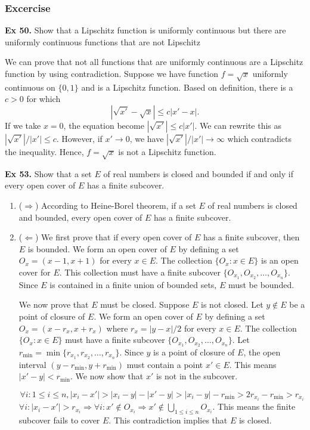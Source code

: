 \subsubsection{Excercise}

\textbf{Ex 50.} Show that a Lipschitz function is uniformly continuous but there are uniformly continuous functions that are not Lipschitz

We can prove that not all functions that are uniformly continuous are a Lipschitz function by using contradiction. Suppose we have function $f = \sqrt{x}$ uniformly continuous on $\{0, 1\}$ and is a Lipschitz function. Based on definition, there is a $c > 0$ for which
\begin{equation}
    |\sqrt{x'} - \sqrt{x}| \leq c|x' - x|.
\end{equation}
If we take $x = 0$, the equation become $|\sqrt{x'}| \leq c |x'|$. We can rewrite this as $|\sqrt{x'}|/|x'| \leq c$. However, if $x' \rightarrow 0$, we have $|\sqrt{x'}|/|x'| \rightarrow \infty$ which contradicts the inequality. Hence, $f = \sqrt{x}$ is not a Lipschitz function.

\noindent \textbf{Ex 53.} \label{ex:53}
Show that a set $E$ of real numbers is closed and bounded if and only if every open cover of $E$ has a finite subcover.
\begin{enumerate}[label=(\roman*)]
	\item ($\Rightarrow$) According to Heine-Borel theorem, if a set $E$ of real numbers is closed and bounded, every open cover of $E$ has a finite subcover.
	
	\item ($\Leftarrow$) We first prove that if every open cover of $E$ has a finite subcover, then $E$ is bounded. We form an open cover of $E$ by defining a set $O_x = (x - 1, x + 1)$ for every $x \in E$. The collection $\{O_x: x\in E\}$ is an open cover for $E$. This collection must have a finite subcover $\{O_{x_1}, O_{x_2}, \ldots, O_{x_n}\}$. Since $E$ is contained in a finite union of bounded sets, $E$ must be bounded.
	
	We now prove that $E$ must be closed. Suppose $E$ is not closed. Let $y \notin E$ be a point of closure of $E$.  We form an open cover of $E$ by defining a set $O_x = (x - r_x, x + r_x)$ where $r_x = |y - x| / 2$ for every $x \in E$. The collection $\{O_x: x\in E\}$ must have a finite subcover $\{O_{x_1}, O_{x_2}, \ldots, O_{x_n}\}$. Let $r_{\min} = \min\{r_{x_1}, r_{x_2}, \ldots, r_{x_n}\}$. Since $y$ is a point of closure of $E$, the open interval $(y - r_{\min}, y + r_{\min})$ must contain a point $x' \in E$. This means $|x' - y| < r_{\min}$. We now show that $x'$ is not in the subcover. 
	
	$$\forall i: 1 \leq i \leq n, |x_i - x'| > |x_i - y| - |x' - y| > |x_i - y| - r_{\min} > 2 r_{x_i} - r_{\min} > r_{x_i}$$
	$\forall i: |x_i - x'| > r_{x_i} \Rightarrow \forall i: x' \notin O_{x_i} \Rightarrow x' \notin \bigcup_{1 \leq i \leq n} O_{x_i}$. This means the finite subcover fails to cover $E$. This contradiction implies that $E$ is closed.
\end{enumerate}